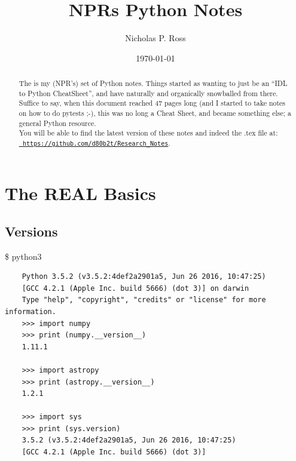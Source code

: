 \documentclass[11pt,a4paper]{article}
\begin{document}
\title{NPRs Python Notes}
\author{Nicholas P. Ross}
\date{\today}
\maketitle




\begin{abstract}
The is my (NPR's) set of Python notes.  Things started as wanting to
just be an ``IDL to Python CheatSheet'', and have naturally and organically 
snowballed from there.  
Suffice to say, when this document reached 47 pages long (and I started to 
take notes on how to do pytests ;-), this was no long a Cheat Sheet, and became 
something else; a general Python resource. \\

You will be able to find the latest version of these notes
and indeed the .tex file at:\\
\href{https://github.com/d80b2t/Research\_Notes}{\tt
https://github.com/d80b2t/Research\_Notes}.
\end{abstract}


\newpage
\tableofcontents


\newpage
\section{The REAL Basics}

    \subsection{Versions}
    \$ python3
    \begin{lstlisting}
    Python 3.5.2 (v3.5.2:4def2a2901a5, Jun 26 2016, 10:47:25) 
    [GCC 4.2.1 (Apple Inc. build 5666) (dot 3)] on darwin
    Type "help", "copyright", "credits" or "license" for more information.
    >>> import numpy 
    >>> print (numpy.__version__)
    1.11.1 

    >>> import astropy 
    >>> print (astropy.__version__)
    1.2.1 
 
    >>> import sys
    >>> print (sys.version)
    3.5.2 (v3.5.2:4def2a2901a5, Jun 26 2016, 10:47:25) 
    [GCC 4.2.1 (Apple Inc. build 5666) (dot 3)]

    \end{lstlisting}
 
\end{document}
